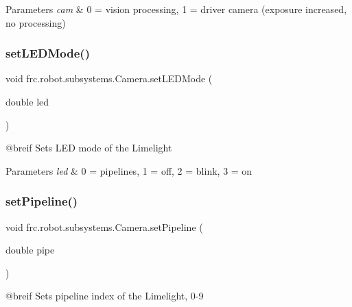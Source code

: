 \begin{DoxyParams}{Parameters}
{\em cam} & 0 = vision processing, 1 = driver camera (exposure increased, no processing) \\
\hline
\end{DoxyParams}
\mbox{\label{classfrc_1_1robot_1_1subsystems_1_1_camera_a21264a7a789b2139797bf04bb7a15dbe}} 
\subsubsection{\texorpdfstring{setLEDMode()}{setLEDMode()}}
{\footnotesize\ttfamily void frc.\+robot.\+subsystems.\+Camera.\+set\+L\+E\+D\+Mode (\begin{DoxyParamCaption}\item[{double}]{led }\end{DoxyParamCaption})\hspace{0.3cm}{\ttfamily [inline]}}

@breif Sets L\+ED mode of the Limelight


\begin{DoxyParams}{Parameters}
{\em led} & 0 = pipeline\textquotesingle{}s, 1 = off, 2 = blink, 3 = on \\
\hline
\end{DoxyParams}
\mbox{\label{classfrc_1_1robot_1_1subsystems_1_1_camera_abc908bea32787055889608bbc41d1783}} 
\subsubsection{\texorpdfstring{setPipeline()}{setPipeline()}}
{\footnotesize\ttfamily void frc.\+robot.\+subsystems.\+Camera.\+set\+Pipeline (\begin{DoxyParamCaption}\item[{double}]{pipe }\end{DoxyParamCaption})\hspace{0.3cm}{\ttfamily [inline]}}

@breif Sets pipeline index of the Limelight, 0-\/9


